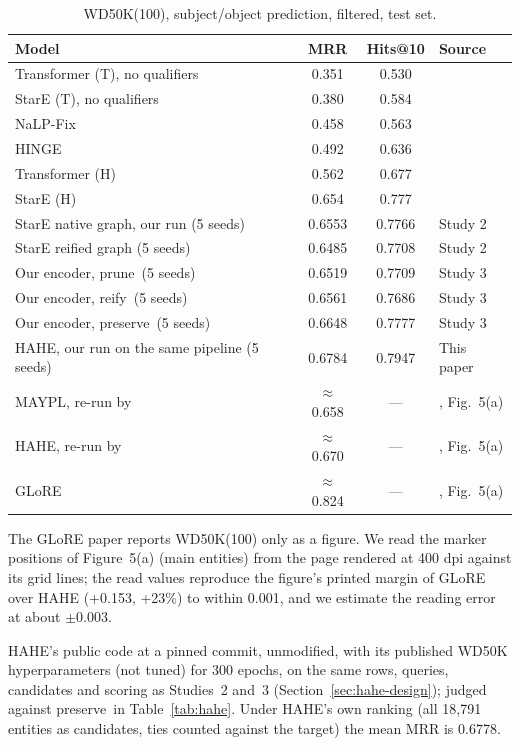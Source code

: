 \documentclass[11pt,a4paper]{article}
\newcommand{\hyper}{\textsf{preserve}}
\newcommand{\reif}{\textsf{reify}}
\newcommand{\prune}{\textsf{prune}}
\begin{document}
\begin{table}[t]
\centering
\small
\begin{threeparttable}
\caption{WD50K(100), subject/object prediction, filtered, test set.}
\label{tab:position}
\begin{tabular}{@{}lccl@{}}
\toprule
Model & MRR & Hits@10 & Source \\
\midrule
Transformer (T), no qualifiers & 0.351 & 0.530 & \citet{galkin2020stare} \\
StarE (T), no qualifiers & 0.380 & 0.584 & \citet{galkin2020stare} \\
NaLP-Fix & 0.458 & 0.563 & \citet{galkin2020stare} \\
HINGE & 0.492 & 0.636 & \citet{galkin2020stare} \\
Transformer (H) & 0.562 & 0.677 & \citet{galkin2020stare} \\
StarE (H) & 0.654 & 0.777 & \citet{galkin2020stare} \\
\midrule
StarE native graph, our run (5 seeds) & 0.6553 & 0.7766 & Study 2 \\
StarE reified graph (5 seeds) & 0.6485 & 0.7708 & Study 2 \\
Our encoder, \prune\ (5 seeds) & 0.6519 & 0.7709 & Study 3 \\
Our encoder, \reif\ (5 seeds) & 0.6561 & 0.7686 & Study 3 \\
Our encoder, \hyper\ (5 seeds) & 0.6648 & 0.7777 & Study 3 \\
HAHE, our run on the same pipeline (5 seeds)\tnote{b} & 0.6784 & 0.7947 & This paper \\
\midrule
MAYPL, re-run by \citet{ji2026glore}\tnote{a} & $\approx$0.658 & --- & \citet{ji2026glore}, Fig.~5(a) \\
HAHE, re-run by \citet{ji2026glore}\tnote{a} & $\approx$0.670 & --- & \citet{ji2026glore}, Fig.~5(a) \\
GLoRE\tnote{a} & $\approx$0.824 & --- & \citet{ji2026glore}, Fig.~5(a) \\
\bottomrule
\end{tabular}
\begin{tablenotes}\footnotesize
\item[a] The GLoRE paper reports WD50K(100) only as a figure. We read the marker positions of Figure~5(a) (main entities) from the page rendered at 400 dpi against its grid lines; the read values reproduce the figure's printed margin of GLoRE over HAHE (+0.153, +23\%) to within 0.001, and we estimate the reading error at about $\pm$0.003.
\item[b] HAHE's public code at a pinned commit, unmodified, with its published WD50K hyperparameters (not tuned) for 300 epochs, on the same rows, queries, candidates and scoring as Studies~2 and~3 (Section~\ref{sec:hahe-design}); judged against \hyper\ in Table~\ref{tab:hahe}. Under HAHE's own ranking (all 18,791 entities as candidates, ties counted against the target) the mean MRR is 0.6778.
\end{tablenotes}
\end{threeparttable}
\end{table}
\end{document}
